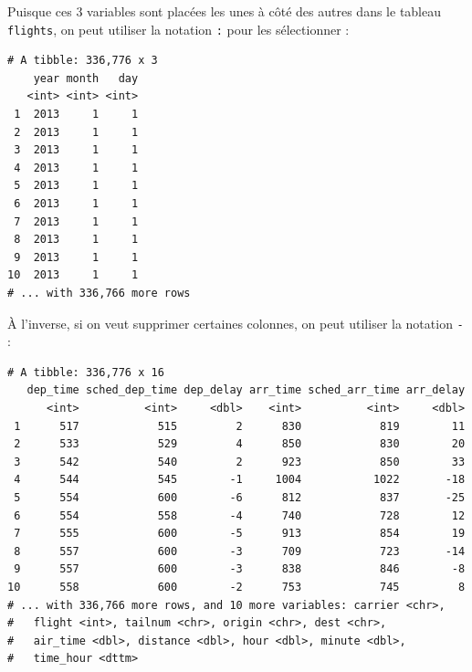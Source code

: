 \documentclass[a4paperpaper,]{article}
\newenvironment{Shaded}{\begin{snugshade}}{\end{snugshade}}
\newcommand{\CommentTok}[1]{\textcolor[rgb]{0.54,0.53,0.53}{#1}}
\newcommand{\KeywordTok}[1]{\textcolor[rgb]{0.12,0.11,0.11}{\textbf{#1}}}
\newcommand{\NormalTok}[1]{\textcolor[rgb]{0.12,0.11,0.11}{#1}}
\newcommand{\OperatorTok}[1]{\textcolor[rgb]{0.12,0.11,0.11}{#1}}
\newcommand{\StringTok}[1]{\textcolor[rgb]{0.75,0.01,0.01}{#1}}
\begin{document}
Puisque ces 3 variables sont placées les unes à côté des autres dans le tableau \texttt{flights}, on peut utiliser la notation \texttt{:} pour les sélectionner :

\begin{Shaded}
\end{Shaded}

\begin{verbatim}
# A tibble: 336,776 x 3
    year month   day
   <int> <int> <int>
 1  2013     1     1
 2  2013     1     1
 3  2013     1     1
 4  2013     1     1
 5  2013     1     1
 6  2013     1     1
 7  2013     1     1
 8  2013     1     1
 9  2013     1     1
10  2013     1     1
# ... with 336,766 more rows
\end{verbatim}

À l'inverse, si on veut supprimer certaines colonnes, on peut utiliser la notation \texttt{-} :

\begin{Shaded}
\end{Shaded}

\begin{verbatim}
# A tibble: 336,776 x 16
   dep_time sched_dep_time dep_delay arr_time sched_arr_time arr_delay
      <int>          <int>     <dbl>    <int>          <int>     <dbl>
 1      517            515         2      830            819        11
 2      533            529         4      850            830        20
 3      542            540         2      923            850        33
 4      544            545        -1     1004           1022       -18
 5      554            600        -6      812            837       -25
 6      554            558        -4      740            728        12
 7      555            600        -5      913            854        19
 8      557            600        -3      709            723       -14
 9      557            600        -3      838            846        -8
10      558            600        -2      753            745         8
# ... with 336,766 more rows, and 10 more variables: carrier <chr>,
#   flight <int>, tailnum <chr>, origin <chr>, dest <chr>,
#   air_time <dbl>, distance <dbl>, hour <dbl>, minute <dbl>,
#   time_hour <dttm>
\end{verbatim}
\end{document}
